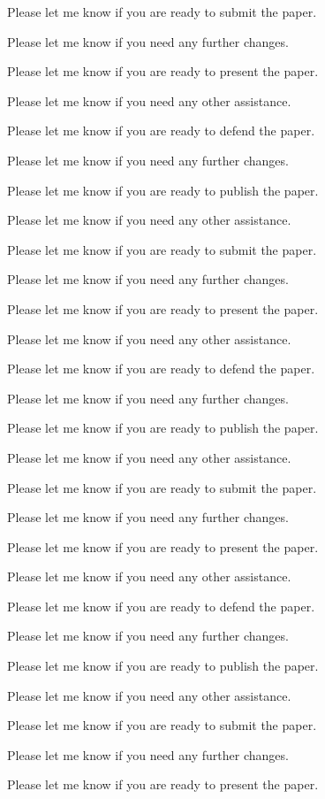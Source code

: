 Please let me know if you are ready to submit the paper. 

Please let me know if you need any further changes. 

Please let me know if you are ready to present the paper. 

Please let me know if you need any other assistance. 

Please let me know if you are ready to defend the paper. 

Please let me know if you need any further changes. 

Please let me know if you are ready to publish the paper. 

Please let me know if you need any other assistance. 

Please let me know if you are ready to submit the paper. 

Please let me know if you need any further changes. 

Please let me know if you are ready to present the paper. 

Please let me know if you need any other assistance. 

Please let me know if you are ready to defend the paper. 

Please let me know if you need any further changes. 

Please let me know if you are ready to publish the paper. 

Please let me know if you need any other assistance. 

Please let me know if you are ready to submit the paper. 

Please let me know if you need any further changes. 

Please let me know if you are ready to present the paper. 

Please let me know if you need any other assistance. 

Please let me know if you are ready to defend the paper. 

Please let me know if you need any further changes. 

Please let me know if you are ready to publish the paper. 

Please let me know if you need any other assistance. 

Please let me know if you are ready to submit the paper. 

Please let me know if you need any further changes. 

Please let me know if you are ready to present the paper. 

